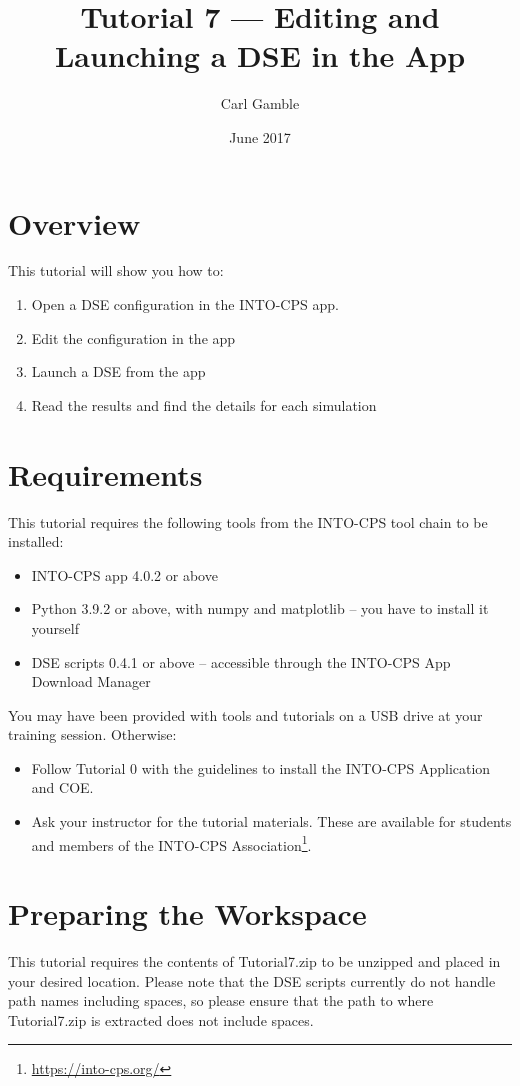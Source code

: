 \documentclass[11pt,a4paper]{../tutorial}
\title{Tutorial 7 --- Editing and Launching a DSE in the App}
\date{June 2017}
\author{Carl Gamble}
\begin{document}
\section*{Overview}

This tutorial will show you how to:

\begin{enumerate}[noitemsep]
\item Open a DSE configuration in the INTO-CPS app.
\item Edit the configuration in the app
\item Launch a DSE from the app
\item Read the results and find the details for each simulation
\end{enumerate}

\section*{Requirements}

This tutorial requires the following tools from the INTO-CPS tool chain to be installed:

\begin{itemize}[noitemsep]
\item INTO-CPS app 4.0.2 or above
\item Python 3.9.2 or above, with numpy and matplotlib -- you have to install it yourself
\item DSE scripts 0.4.1 or above -- accessible through the INTO-CPS App Download Manager
\end{itemize}

You may have been provided with tools and tutorials on a USB drive at your training session. Otherwise: 
\begin{itemize}[noitemsep]
\item Follow Tutorial 0 with the guidelines to install the INTO-CPS Application and COE.
\item Ask your instructor for the tutorial materials. These are available for students and members of the INTO-CPS Association\footnote{\url{https://into-cps.org/}}.
\end{itemize}


\section{Preparing the Workspace}
This tutorial requires the contents of Tutorial7.zip to be unzipped and placed in your desired location.  Please note that the DSE scripts currently do not handle path names including spaces, so please ensure that the path to where Tutorial7.zip is extracted does not include spaces.
\end{document}
